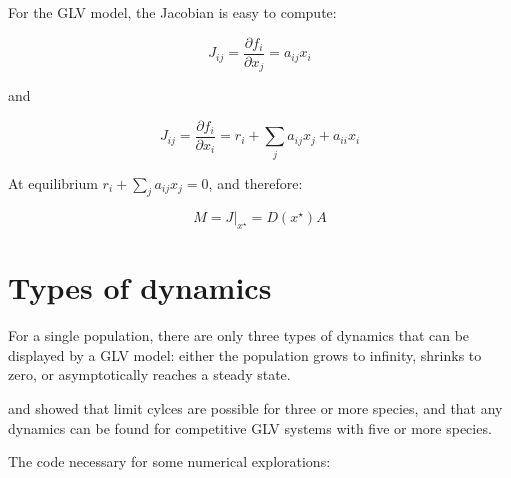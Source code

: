 \documentclass[]{book}
\begin{document}
For the GLV model, the Jacobian is easy to compute:

\[
J_{ij} = \frac{\partial f_i}{\partial x_j} = a_{ij} x_i
\]

and

\[
J_{ij} = \frac{\partial f_i}{\partial x_i} = r_i + \sum_j a_{ij} x_j + a_{ii} x_i
\]

At equilibrium \(r_i + \sum_j a_{ij} x_j = 0\), and therefore:

\[
M = \left. {J} \right|_{ {x}^\star} = D(x^\star)A
\]

\hypertarget{types-of-dynamics}{%
\section{Types of dynamics}\label{types-of-dynamics}}

For a single population, there are only three types of dynamics that can be displayed by a GLV model: either the population grows to infinity, shrinks to zero, or asymptotically reaches a steady state.

\citet{smale1976differential} and \citet{hirsch1982systems} showed that limit cylces are possible for three or more species, and that any dynamics can be found for competitive GLV systems with five or more species.

The code necessary for some numerical explorations:
\end{document}
